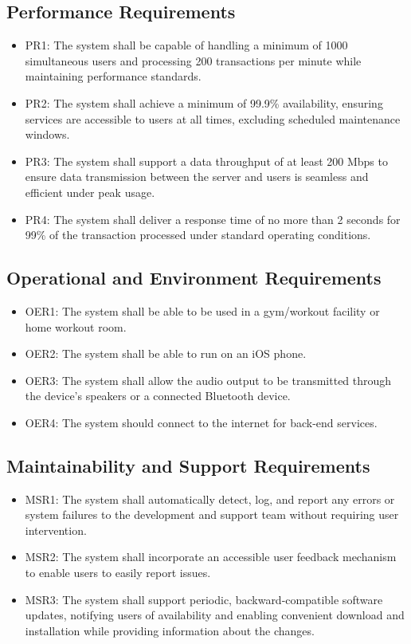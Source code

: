 \documentclass[12pt]{article}
\begin{document}
\subsection{Performance Requirements}
\begin{itemize}
\item PR1: The system shall be capable of handling a minimum of 1000 simultaneous users and processing 200 transactions per minute while maintaining performance standards.
\item PR2: The system shall achieve a minimum of 99.9\% availability, ensuring services are accessible to users at all times, excluding scheduled maintenance windows.
\item PR3: The system shall support a data throughput of at least 200 Mbps to ensure data transmission between the server and users is seamless and efficient under peak usage.
\item PR4: The system shall deliver a response time of no more than 2 seconds for 99\% of the transaction processed under standard operating conditions.
\end{itemize}

\subsection{Operational and Environment Requirements}
\begin{itemize}
\item OER1: The system shall be able to be used in a gym/workout facility or home workout room.
\item OER2: The system shall be able to run on an iOS phone.
\item OER3: The system shall allow the audio output to be transmitted through the device’s speakers or a connected Bluetooth device.
\item OER4: The system should connect to the internet for back-end services.
\end{itemize}

\subsection{Maintainability and Support Requirements}
\begin{itemize}
\item MSR1: The system shall automatically detect, log, and report any errors or system failures to the development and support team without requiring user intervention.
\item MSR2: The system shall incorporate an accessible user feedback mechanism to enable users to easily report issues.
\item MSR3: The system shall support periodic, backward-compatible software updates, notifying users of availability and enabling convenient download and installation while providing information about the changes.
\end{itemize}
\end{document}
